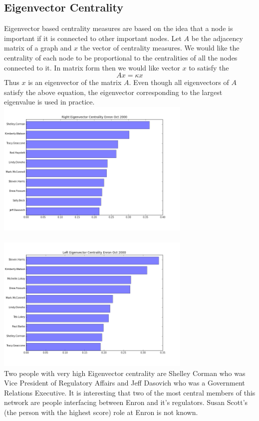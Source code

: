 \documentclass[12pt]{article}
\begin{document}
	\subsection{Eigenvector Centrality} Eigenvector based centrality measures are based on the idea that a node is important if it is connected to other important nodes. Let $A$ be the adjacency matrix of a graph and $x$ the vector of centrality measures. We would like the centrality of each node to be proportional to the centralities of all the nodes connected to it. In matrix form then we would like vector $x$ to satisfy the 
		\begin{equation}
			A x = \kappa x
		\end{equation}
		Thus $x$ is an eigenvector of the matrix $A$. Even though all eigenvectors of $A$ satisfy the above equation, the eigenvector corresponding to the largest eigenvalue is used in practice. \\
		\includegraphics[width=0.7\textwidth]{figureRightEigOct2000} \\
		\\
		\includegraphics[width=0.7\textwidth]{figureLeftEigOct2000} \\
		
		Two people with very high Eigenvector centrality are Shelley Corman who was Vice President of Regulatory Affairs and Jeff Dasovich who was a Government Relations Executive. It is interesting that two of the most central members of this network are people interfacing between Enron and it's regulators. Susan Scott's (the person with the highest score) role at Enron is not known.\\ \\
		
\end{document}

